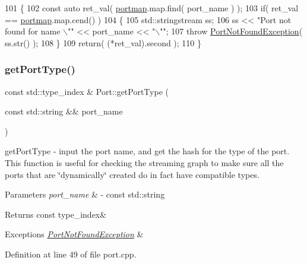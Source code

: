 \begin{DoxyCode}
101 \{
102    \textcolor{keyword}{const} \textcolor{keyword}{auto} ret\_val( \hyperlink{class_port_a537a8a0c2a47acbf8654f286200aee90}{portmap}.map.find( port\_name ) );
103    \textcolor{keywordflow}{if}( ret\_val == \hyperlink{class_port_a537a8a0c2a47acbf8654f286200aee90}{portmap}.map.cend() )
104    \{
105       std::stringstream ss;
106       ss << \textcolor{stringliteral}{"Port not found for name \(\backslash\)""} << port\_name << \textcolor{stringliteral}{"\(\backslash\)""};
107       \textcolor{keywordflow}{throw} \hyperlink{class_port_not_found_exception}{PortNotFoundException}( ss.str() );
108    \}
109    \textcolor{keywordflow}{return}( (*ret\_val).second );
110 \}
\end{DoxyCode}
\hypertarget{class_port_af34969d8f5e17ad29233334526d5b77b}{}\label{class_port_af34969d8f5e17ad29233334526d5b77b} 
\subsubsection{\texorpdfstring{get\+Port\+Type()}{getPortType()}}
{\footnotesize\ttfamily const std\+::type\+\_\+index \& Port\+::get\+Port\+Type (\begin{DoxyParamCaption}\item[{const std\+::string \&\&}]{port\+\_\+name }\end{DoxyParamCaption})}

get\+Port\+Type -\/ input the port name, and get the hash for the type of the port. This function is useful for checking the streaming graph to make sure all the ports that are \char`\"{}dynamically\char`\"{} created do in fact have compatible types. 
\begin{DoxyParams}{Parameters}
{\em port\+\_\+name} & -\/ const std\+::string \\
\hline
\end{DoxyParams}
\begin{DoxyReturn}{Returns}
const type\+\_\+index\& 
\end{DoxyReturn}

\begin{DoxyExceptions}{Exceptions}
{\em \hyperlink{class_port_not_found_exception}{Port\+Not\+Found\+Exception}} & \\
\hline
\end{DoxyExceptions}


Definition at line 49 of file port.\+cpp.



